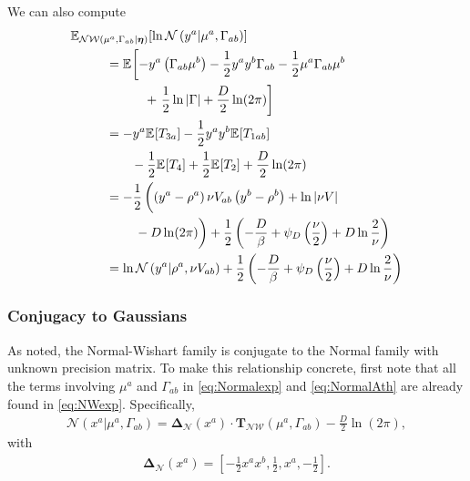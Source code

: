 \documentclass[aps,showpacs,twocolumn,prd,superscriptaddress,nofootinbib]{revtex4}
\newcommand{\nn}{\nonumber}
\newcommand{\E}[1]{{\mathbb E}_{#1}\!}
\begin{document}
We can also compute
\begin{align}
  \E{\mathcal {NW}\left(\mu^a,\Gamma_{ab}|\bm\eta\right)}\left[\ln\mathcal{N}\left(y^a|\mu^a,\Gamma_{ab}\right)\right]\mkern-200mu &\mkern200mu\nn\\
  &=\E{}\left[-y^a\left(\Gamma_{ab}\mu^b\right) -\frac12 y^ay^b \Gamma_{ab} -\frac12 \mu^a\Gamma_{ab}\mu^b\right.\nn\\
    &\qquad\quad+\left.\frac12\ln\left|\Gamma\right|+\frac D2\ln(2\pi)  \right]\nn\\
  &=-y^a\E{}\left[T_{3a}\right] -\frac12 y^ay^b\E{}\left[T_{1ab}\right]\nn\\
  &\qquad-\frac12 \E{}\left[T_4\right]+\frac12\E{}\left[T_2\right]+\frac D2\ln(2\pi)\nn\\
  &=-\frac12\left(\left(y^a-\rho^a\right)\nu V_{ab}\left(y^b-\rho^b\right)+ \ln\left|\nu V\right|\vphantom{\frac12}\right.\nn\\
  &\qquad\left.\vphantom{\frac12}-D\ln(2\pi)\right)+\frac12\left(-\frac D\beta+\psi_D\left(\frac\nu2\right)+D\ln\frac2\nu \right)\nn\\
  &=\ln\mathcal{N}\left(y^a|\rho^a,\nu V_{ab}\right)+\frac12\left(-\frac D\beta+\psi_D\left(\frac\nu2\right)+D\ln\frac2\nu \right)\label{eq:ENWoflogN}
\end{align}

\subsubsection{Conjugacy to Gaussians}
As noted, the Normal-Wishart family is conjugate to the Normal family with unknown precision matrix.  To make this relationship concrete, first note that all the terms involving $\mu^a$ and $\Gamma_{ab}$ in \eqref{eq:Normalexp} and \eqref{eq:NormalAth} are already found in \eqref{eq:NWexp}.  Specifically,
\begin{align*}
  \mathcal{N}(x^a|\mu^a,\Gamma_{ab})=\bm\Delta_{\mathcal{N}}(x^a)\cdot\bm T_{\mathcal{NW}}(\mu^a,\Gamma_{ab})-\frac D2\ln(2\pi),
\end{align*}
with
\begin{align}
  \bm\Delta_{\mathcal{N}}(x^a)=\left[-\frac12x^ax^b,\frac12,x^a,-\frac12\right].\label{eq:NormalDelta}
\end{align}
\end{document}
